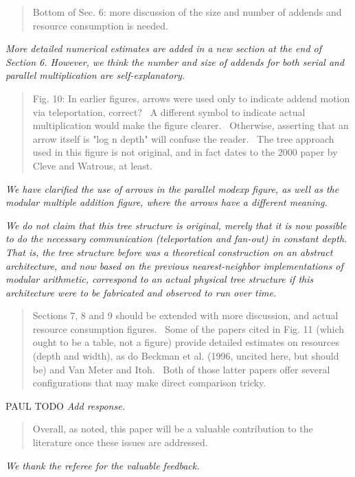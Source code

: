 \documentclass{article}
\theoremstyle{plain} \newtheorem{lemma}{Lemma}
\begin{document}
\begin{quote}
Bottom of Sec. 6: more discussion of the size and number of addends
and resource consumption is needed.
\end{quote}

{\it More detailed numerical estimates are added in a new section at the end of
Section 6. However, we think the number and size of addends for both serial and parallel
multiplication are self-explanatory.}

\begin{quote}
Fig. 10: In earlier figures, arrows were used only to indicate addend
motion via teleportation, correct?  A different symbol to indicate
actual multiplication would make the figure clearer.  Otherwise,
asserting that an arrow itself is "log n depth" will confuse the
reader.  The tree approach used in this figure is not original, and in
fact dates to the 2000 paper by Cleve and Watrous, at least.
\end{quote}

{\it We have clarified the use of arrows in the parallel modexp figure, as well as the modular multiple addition figure, where the arrows have a different meaning.}

{\it We do not claim that this tree structure is original, merely that it is
now possible to do the necessary communication (teleportation and fan-out)
in constant depth. That is, the tree structure before was a theoretical
construction on an abstract architecture, and now based on the previous nearest-neighbor implementations
of modular arithmetic, correspond to an actual physical tree structure if
this architecture were to be fabricated and observed to run over time.}

\begin{quote}
Sections 7, 8 and 9 should be extended with more discussion, and
actual resource consumption figures.  Some of the papers cited in
Fig. 11 (which ought to be a table, not a figure) provide detailed
estimates on resources (depth and width), as do Beckman et al. (1996,
uncited here, but should be) and Van Meter and Itoh.  Both of those
latter papers offer several configurations that may make direct
comparison tricky.
\end{quote}

PAUL TODO
{\it Add response.}

\begin{quote}
Overall, as noted, this paper will be a valuable contribution to the
literature once these issues are addressed.
\end{quote}

{\it We thank the referee for the valuable feedback.}



\end{document}
